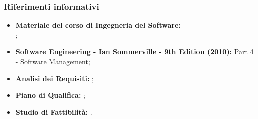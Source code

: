 		\subsubsection{Riferimenti informativi}
			\begin{itemize}
				\item \textbf{Materiale del corso di Ingegneria del Software:} \\
					;
				\item \textbf{Software Engineering - Ian Sommerville - 9th Edition (2010):} Part 4 - Software Management;
				\item \textbf{Analisi dei Requisiti:} ;
				\item \textbf{Piano di Qualifica:} ;
				\item \textbf{Studio di Fattibilità:} .
			\end{itemize}